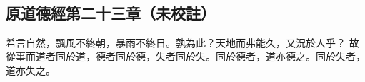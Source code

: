 ﻿%
%

\chapter{~}

\section{原道德經第二十三章（未校註）}

\begin{withgezhu}

\zhsong


\textcolor{tongjia-color}{希言自然，飄風不終朝，暴雨不終日}。孰為此？天地而弗能久，又況於人乎？
\textcolor{tongjia-color}{故從事而道者同於道，德者同於德，失者同於失。同於德者，道亦德之。同於失者，道亦失之。}

\end{withgezhu}
